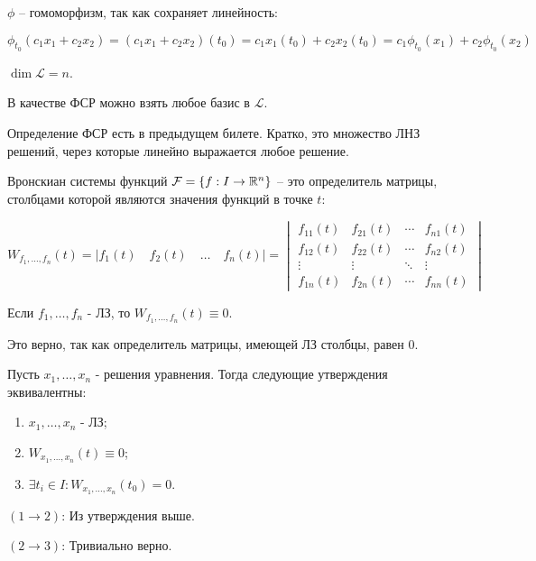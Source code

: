 $\phi$ -- гомоморфизм, так как сохраняет линейность:

\begin{equation*}
    \phi_{t_0}(c_1 x_1 + c_2 x_2) = (c_1 x_1 + c_2 x_2) (t_0) = c_1 x_1(t_0) + c_2 x_2(t_0) = c_1 \phi_{t_0}(x_1) + c_2\phi_{t_0}(x_2)
\end{equation*}

\Endproof

\Consequence $\dim \mathcal{L} = n$.

\Consequence В качестве ФСР можно взять любое базис в $\mathcal{L}$.

\Note Определение ФСР есть в предыдущем билете.
Кратко, это множество ЛНЗ решений, через которые линейно выражается любое решение.

\Def Вронскиан системы функций $\mathcal{F} = \{f: I \rightarrow \mathbb{R}^n\}$ -- это определитель матрицы, столбцами которой являются значения функций в точке $t$:

\begin{equation*}
    W_{f_1, \dots, f_n}(t) = |f_1(t) \quad f_2(t) \quad\dots\quad f_n(t)| =
    \begin{vmatrix}
             f_{11}(t)& f_{21}(t) & \cdots & f_{n1}(t) \\
             f_{12}(t) & f_{22}(t) & \cdots & f_{n2}(t) \\
             \vdots & \vdots & \ddots & \vdots \\
             f_{1n}(t) & f_{2n}(t) & \cdots & f_{nn}(t)
    \end{vmatrix}
\end{equation*}

\Statement Если $f_1, \dots, f_n$ - ЛЗ, то $W_{f_1, \dots, f_n}(t) \equiv 0$.

Это верно, так как определитель матрицы, имеющей ЛЗ столбцы, равен 0.

\Th Пусть $x_1, \dots, x_n$ - решения уравнения. Тогда следующие утверждения эквивалентны:

\begin{enumerate}
    \item $x_1, \dots, x_n$ - ЛЗ;
    \item $W_{x_1, \dots, x_n}(t) \equiv 0$;
    \item $\exists t_i \in I: W_{x_1, \dots, x_n}(t_0) = 0$.
\end{enumerate}

\Proof

$(1\rightarrow 2)$: Из утверждения выше.

$(2\rightarrow 3)$: Тривиально верно.

